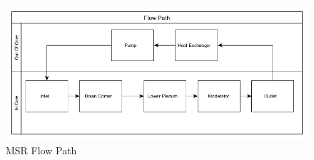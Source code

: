 \label{MSRLoop}
\begin{figure}[ht]
\includegraphics[width=\textwidth,height=\textheight,keepaspectratio]{MSRLoop.png} 
\caption{MSR Flow Path}
\end{figure}